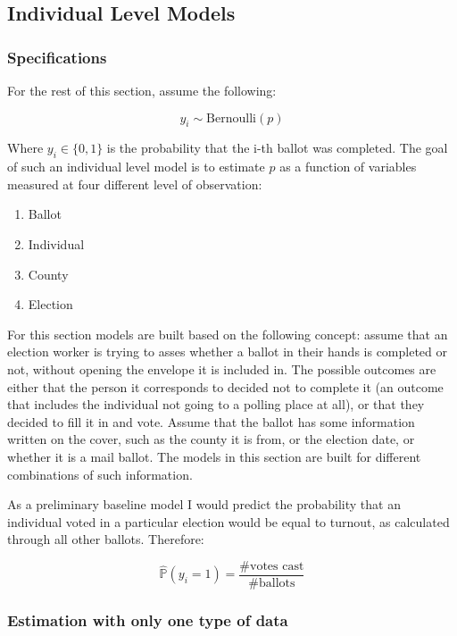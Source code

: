 \documentclass[]{article}
\begin{document}
\subsection{Individual Level Models}\label{individual-level-models}

\subsubsection{Specifications}\label{specifications-1}

For the rest of this section, assume the following:

\[y_i \sim \text{Bernoulli}(p)\]

Where \(y_i \in \{0,1\}\) is the probability that the i-th ballot was
completed. The goal of such an individual level model is to estimate
\(p\) as a function of variables measured at four different level of
observation:

\begin{enumerate}
   \item Ballot
   \item Individual
   \item County
   \item Election
\end{enumerate}

For this section models are built based on the following concept: assume
that an election worker is trying to asses whether a ballot in their
hands is completed or not, without opening the envelope it is included
in. The possible outcomes are either that the person it corresponds to
decided not to complete it (an outcome that includes the individual not
going to a polling place at all), or that they decided to fill it in and
vote. Assume that the ballot has some information written on the cover,
such as the county it is from, or the election date, or whether it is a
mail ballot. The models in this section are built for different
combinations of such information.

As a preliminary baseline model I would predict the probability that an
individual voted in a particular election would be equal to turnout, as
calculated through all other ballots. Therefore:

\[\hat{\mathbb{P}}(y_i = 1) = \frac{\# \text{votes cast}}{\# \text{ballots}}\]

\subsubsection{Estimation with only one type of
data}\label{estimation-with-only-one-type-of-data}
\end{document}
